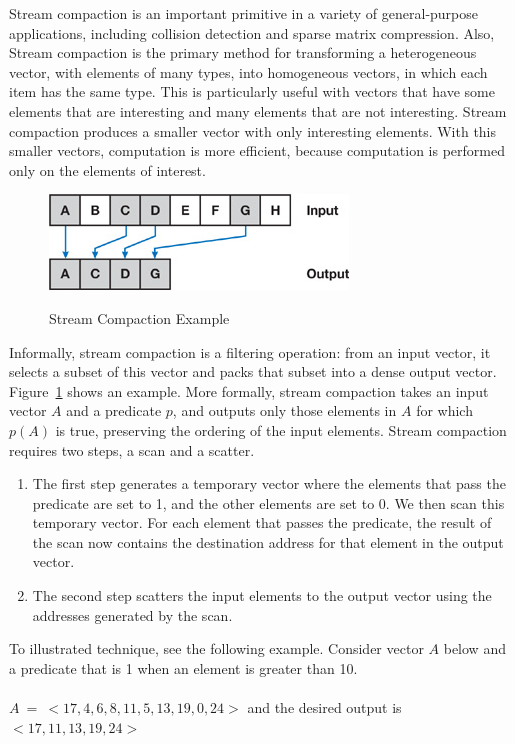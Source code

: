 \documentclass[Ingles]{ic-tese-v1}
\begin{document}
Stream compaction is an important primitive in a variety of general-purpose applications, including collision detection and sparse matrix compression. Also, Stream compaction is the primary method for transforming a heterogeneous vector, with elements of many types, into homogeneous vectors, in which each item has the same type. This is particularly useful with vectors that have some elements that are interesting and many elements that are not interesting. Stream compaction produces a smaller vector with only interesting elements. With this smaller vectors, computation is more efficient, because computation is performed only on the  elements of interest.\\
\begin{figure}[t]
	\centering
	\caption{Stream Compaction Example}
	\includegraphics[scale=1.2]{images/stremexample.jpg}
	\label{fig:streamexample}
\end{figure}
Informally, stream compaction is a filtering operation: from an input vector, it selects a subset of this vector and packs that subset into a dense output vector. Figure~\ref{fig:streamexample} shows an example. More formally, stream compaction takes an input vector $A$ and a predicate $p$, and outputs only those elements in $A$ for which $p(A)$ is true, preserving the ordering of the input elements.
Stream compaction requires two steps, a scan and a scatter.
\begin{enumerate}
\item The first step generates a temporary vector where the elements that pass the predicate are set to 1, and the other elements are set to 0. We then scan this temporary vector. For each element that passes the predicate, the result of the scan now contains the destination address for that element in the output vector.
\item The second step scatters the input elements to the output vector using the addresses generated by the scan.
\end{enumerate}
To illustrated  technique, see the following example.
Consider  vector $A$ below and a predicate that is 1 when an element is greater than 10.\\\\
$A \: = \: <17, 4, 6, 8, 11, 5, 13, 19, 0, 24>$ and the desired output is   $<17, 11, 13, 19, 24>$\\\\
\end{document}
